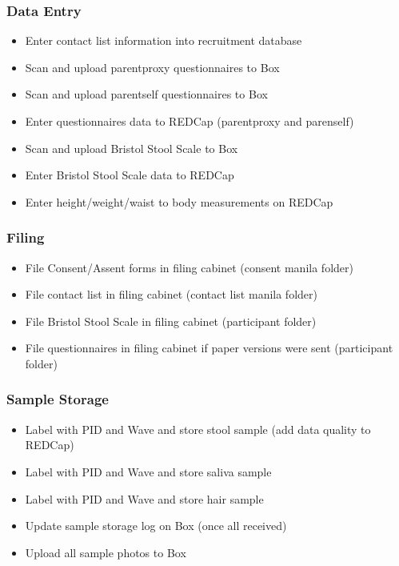 \documentclass[]{book}
\providecommand{\tightlist}{%
  \setlength{\itemsep}{0pt}\setlength{\parskip}{0pt}}
\begin{document}
\hypertarget{data-entry-1}{%
\subsubsection{Data Entry}\label{data-entry-1}}

\begin{itemize}
\tightlist
\item
  Enter contact list information into recruitment database
\item
  Scan and upload parentproxy questionnaires to Box
\item
  Scan and upload parentself questionnaires to Box
\item
  Enter questionnaires data to REDCap (parentproxy and parenself)
\item
  Scan and upload Bristol Stool Scale to Box
\item
  Enter Bristol Stool Scale data to REDCap
\item
  Enter height/weight/waist to body measurements on REDCap
\end{itemize}

\hypertarget{filing-2}{%
\subsubsection{Filing}\label{filing-2}}

\begin{itemize}
\tightlist
\item
  File Consent/Assent forms in filing cabinet (consent manila folder)
\item
  File contact list in filing cabinet (contact list manila folder)
\item
  File Bristol Stool Scale in filing cabinet (participant folder)
\item
  File questionnaires in filing cabinet if paper versions were sent (participant folder)
\end{itemize}

\hypertarget{sample-storage}{%
\subsubsection{Sample Storage}\label{sample-storage}}

\begin{itemize}
\tightlist
\item
  Label with PID and Wave and store stool sample (add data quality to REDCap)
\item
  Label with PID and Wave and store saliva sample
\item
  Label with PID and Wave and store hair sample
\item
  Update sample storage log on Box (once all received)
\item
  Upload all sample photos to Box
\end{itemize}
\end{document}
